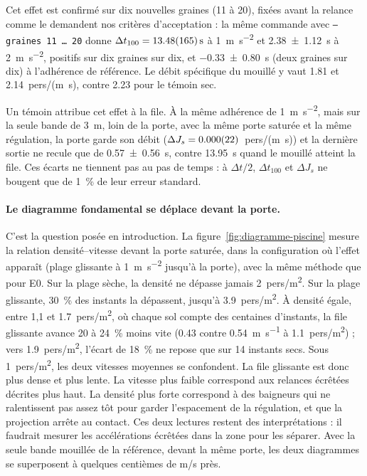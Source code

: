 Cet effet est confirmé sur dix nouvelles graines (11 à 20), fixées avant la relance comme le
demandent nos critères d'acceptation : la même commande avec \texttt{--graines 11 \ldots\ 20}
donne $\Delta t_{100}=\SI{13.48 \pm 1.65}{\second}$ à \SI{1}{\metre\per\second\squared} et
\SI{2.38 \pm 1.12}{\second} à \SI{2}{\metre\per\second\squared}, positifs sur dix graines sur
dix, et \SI{-0.33 \pm 0.80}{\second} (deux graines sur dix) à l'adhérence de référence. Le
débit spécifique du mouillé y vaut \num{1.81} et \num{2.14}~pers/(\si{\metre\second}), contre
\num{2.23} pour le témoin sec.

Un témoin attribue cet effet à la file. À la même adhérence de
\SI{1}{\metre\per\second\squared}, mais sur la seule bande de \SI{3}{\metre}, loin de la
porte, avec la même porte saturée et la même régulation, la porte garde son débit
($\Delta J_s = \num{0.000 \pm 0.022}$~pers/(\si{\metre\second})) et la dernière sortie ne
recule que de \SI{0.57 \pm 0.56}{\second}, contre \SI{13.95}{\second} quand le mouillé
atteint la file. Ces écarts ne tiennent pas au pas de temps : à $\Delta t/2$,
$\Delta t_{100}$ et $\Delta J_s$ ne bougent que de \SI{1}{\percent} de leur erreur standard.

\paragraph{Le diagramme fondamental se déplace devant la porte.}
C'est la question posée en introduction. La figure~\ref{fig:diagramme-piscine} mesure la
relation densité--vitesse devant la porte saturée, dans la configuration où l'effet apparaît
(plage glissante à \SI{1}{\metre\per\second\squared} jusqu'à la porte), avec la même méthode
que pour E0. Sur la plage sèche, la densité ne dépasse jamais \num{2}~pers/\si{\metre\squared}.
Sur la plage glissante, \SI{30}{\percent} des instants la dépassent, jusqu'à
\num{3.9}~pers/\si{\metre\squared}. À densité égale, entre 1,1 et
\num{1.7}~pers/\si{\metre\squared}, où chaque sol compte des centaines d'instants, la file
glissante avance 20 à \SI{24}{\percent} moins vite (\num{0.43} contre
\SI{0.54}{\metre\per\second} à \num{1.1}~pers/\si{\metre\squared}) ; vers
\num{1.9}~pers/\si{\metre\squared}, l'écart de \SI{18}{\percent} ne repose que sur
14 instants secs. Sous
\num{1}~pers/\si{\metre\squared}, les deux vitesses moyennes se confondent. La file glissante
est donc plus dense et plus lente. La vitesse plus faible correspond aux relances écrêtées
décrites plus haut. La densité plus forte correspond à des baigneurs qui ne ralentissent pas
assez tôt pour garder l'espacement de la régulation, et que la projection arrête au contact.
Ces deux lectures restent des interprétations : il faudrait mesurer les accélérations
écrêtées dans la zone pour les séparer. Avec la seule bande mouillée de la référence, devant
la même porte, les deux diagrammes se superposent à quelques centièmes de m/s près.

